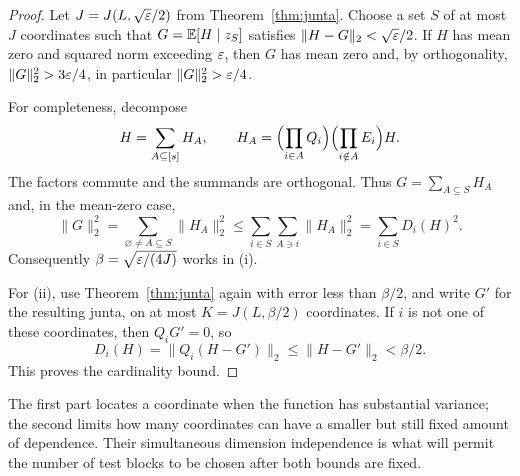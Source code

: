 \begin{proof}
Let $J=J(L,\sqrt{\varepsilon}/2)$ from Theorem~\ref{thm:junta}.
Choose a set $S$ of at most $J$ coordinates such that
$G=\mathbb E[H\mid z_S]$ satisfies $\|H-G\|_2<\sqrt{\varepsilon}/2$.
If $H$ has mean zero and squared norm exceeding $\varepsilon$, then
$G$ has mean zero and, by orthogonality,
$\|G\|_2^2>3\varepsilon/4$, in particular $\|G\|_2^2>\varepsilon/4$.

For completeness, decompose
\[
 H=\sum_{A\subseteq[s]} H_A,\qquad
 H_A=\Bigl(\prod_{i\in A}Q_i\Bigr)
     \Bigl(\prod_{i\notin A}E_i\Bigr)H .
\]
The factors commute and the summands are orthogonal.
Thus $G=\sum_{A\subseteq S}H_A$ and, in the mean-zero case,
\[
 \|G\|_2^2
 =\sum_{\varnothing\ne A\subseteq S}\|H_A\|_2^2
 \le \sum_{i\in S}\sum_{A\ni i}\|H_A\|_2^2
 =\sum_{i\in S}D_i(H)^2.
\]
Consequently $\beta=\sqrt{\varepsilon/(4J)}$ works in (i).

For (ii), use Theorem~\ref{thm:junta} again with error less than
$\beta/2$, and write $G'$ for the resulting junta, on at most
$K=J(L,\beta/2)$ coordinates. If $i$ is not one of these coordinates,
then $Q_iG'=0$, so
\[
 D_i(H)=\|Q_i(H-G')\|_2\le\|H-G'\|_2<\beta/2.
\]
This proves the cardinality bound.
\end{proof}

The first part locates a coordinate when the function has substantial
variance; the second limits how many coordinates can have a smaller
but still fixed amount of dependence. Their simultaneous dimension
independence is what will permit the number of test blocks to be chosen
after both bounds are fixed.
